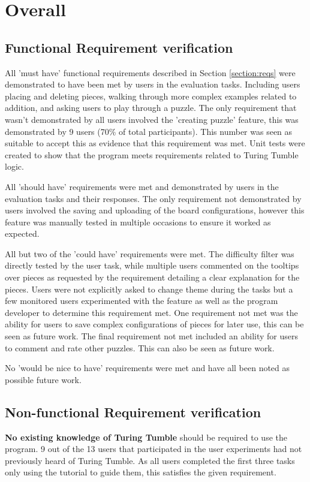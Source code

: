 \documentclass{l4proj}
\begin{document}
\section{Overall}
\subsection{Functional Requirement verification}

All 'must have' functional requirements described in Section \ref{section:reqs} were demonstrated to have been met by users in the evaluation tasks. Including users placing and deleting pieces, walking through more complex examples related to addition, and asking users to play through a puzzle. The only requirement that wasn't demonstrated by all users involved the 'creating puzzle' feature, this was demonstrated by 9 users (70\% of total participants). This number was seen as suitable to accept this as evidence that this requirement was met. Unit tests were created to show that the program meets requirements related to Turing Tumble logic.

All 'should have' requirements were met and demonstrated by users in the evaluation tasks and their responses. The only requirement not demonstrated by users involved the saving and uploading of the board configurations, however this feature was manually tested in multiple occasions to ensure it worked as expected. 

All but two of the 'could have' requirements were met. The difficulty filter was directly tested by the user task, while multiple users commented on the tooltips over pieces as requested by the requirement detailing a clear explanation for the pieces. Users were not explicitly asked to change theme during the tasks but a few monitored users experimented with the feature as well as the program developer to determine this requirement met. One requirement not met was the ability for users to save complex configurations of pieces for later use, this can be seen as future work. The final requirement not met included an ability for users to comment and rate other puzzles. This can also be seen as future work. 

No 'would be nice to have' requirements were met and have all been noted as possible future work.

\subsection{Non-functional Requirement verification}
\textbf{No existing knowledge of Turing Tumble} should be required to use the program. 9 out of the 13 users that participated in the user experiments had not previously heard of Turing Tumble. As all users completed the first three tasks only using the tutorial to guide them, this satisfies the given requirement.
\end{document}
